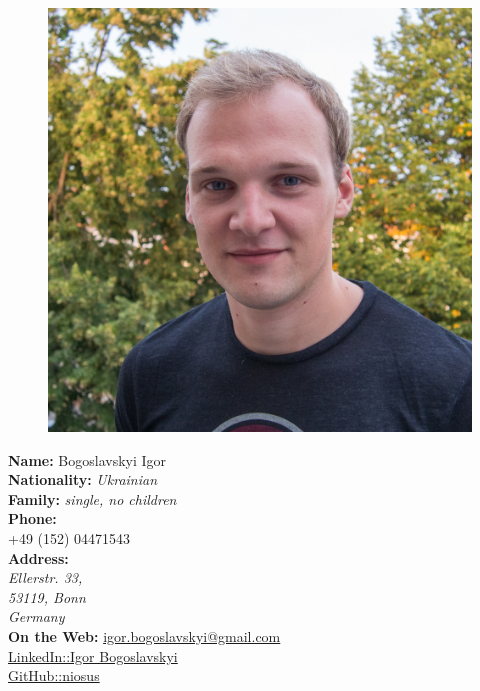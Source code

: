 \documentclass[a4paper,12pt,final]{memoir}
\newcommand{\SmallSep}{\vspace{0.5em}}
\begin{document}
\begin{figure}
	\hfill
	\includegraphics[width=\columnwidth]{igor.jpg}
	\vspace{-5cm}
\end{figure}

\begin{flushleft}\small
	\textbf{Name:} Bogoslavskyi Igor\\
	\SmallSep
	\textbf{Nationality:} \emph{Ukrainian}\\
	\SmallSep
	\textbf{Family:} \emph{single, no children}\\
	\SmallSep
	\textbf{Phone:} \\ +49 (152) 04471543\\
	\SmallSep
	\textbf{Address:}\\ \emph{Ellerstr. 33, \\53119, Bonn \\Germany}\\
	\SmallSep
	\textbf{On the Web:}
	\href{mailto:igor.bogoslavskyi@gmail.com}{igor.bogoslavskyi@gmail.com}\\
	\SmallSep
	\href{https://de.linkedin.com/in/igor-bogoslavskyi-72650b43}{LinkedIn::Igor Bogoslavskyi}\\
	\SmallSep
	\href{https://github.com/niosus}{GitHub::niosus}\\
	\SmallSep
\end{flushleft}
\normalsize
\end{document}
